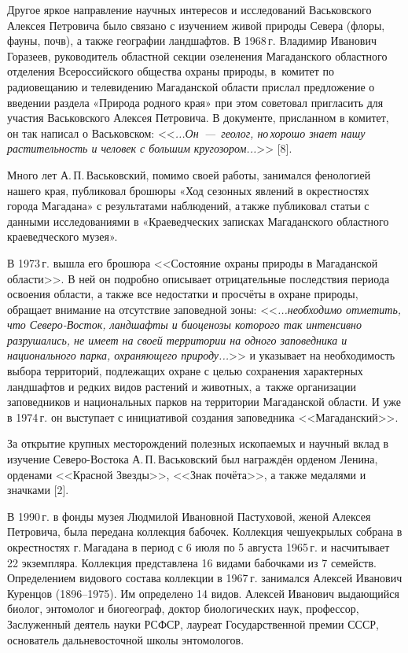 Другое яркое направление научных интересов и исследований Васьковского Алексея Петровича было связано с изучением живой природы Севера (флоры, фауны, почв), а также географии ландшафтов. В 1968\,г. Владимир Иванович Горазеев, руководитель областной секции озеленения Магаданского областного отделения Всероссийского общества охраны природы, в~комитет по радиовещанию и телевидению Магаданской области прислал предложение о введении раздела «Природа родного края» при этом советовал пригласить для участия Васьковского Алексея Петровича. В документе, присланном в комитет, он так написал о Васьковском: <<\textit{\mbox{...Он~--- геолог,} но\,хорошо знает нашу растительность и человек с большим кругозором...}>> [8].

Много лет А.\,П.\,Васьковский, помимо своей работы, занимался фенологией нашего края, публиковал брошюры «Ход сезонных явлений в окрестностях города Магадана» с результатами наблюдений, а\,также публиковал статьи с данными исследованиями в «Краеведческих записках Магаданского областного краеведческого музея».

В 1973\,г. вышла его брошюра <<Состояние охраны природы в Магаданской области>>. В ней он подробно описывает отрицательные последствия периода освоения области, а также все недостатки и просчёты в охране природы, обращает внимание на отсутствие заповедной зоны: <<\textit{...необходимо отметить, что Северо-Восток, ландшафты и биоценозы которого так интенсивно разрушались, не имеет на своей территории на одного заповедника и национального парка, охраняющего природу...}>> и указывает на необходимость выбора территорий, подлежащих охране с целью сохранения характерных ландшафтов и редких видов растений и животных, а~также организации заповедников и национальных парков на территории Магаданской области. И уже в 1974\,г. он выступает с инициативой создания заповедника <<Магаданский>>.

За открытие крупных месторождений полезных ископаемых и научный вклад в изучение Северо-Востока А.\,П.\,Васьковский был награждён орденом Ленина, орденами <<Красной Звезды>>, <<Знак почёта>>, а также медалями и значками [2].

В 1990\,г. в фонды музея Людмилой Ивановной Пастуховой, женой Алексея Петровича, была передана коллекция бабочек. Коллекция чешуекрылых собрана в окрестностях г.\,Магадана в период с 6 июля по 5 августа 1965\,г. и насчитывает 22 экземпляра. Коллекция представлена 16 видами бабочками из 7 семейств. Определением видового состава коллекции в 1967\,г. занимался Алексей Иванович Куренцов (1896--1975). Им определено 14 видов.
Алексей Иванович выдающийся биолог, энтомолог и биогеограф, доктор биологических наук, профессор, Заслуженный деятель науки РСФСР, лауреат Государственной премии СССР, основатель дальневосточной школы энтомологов.

